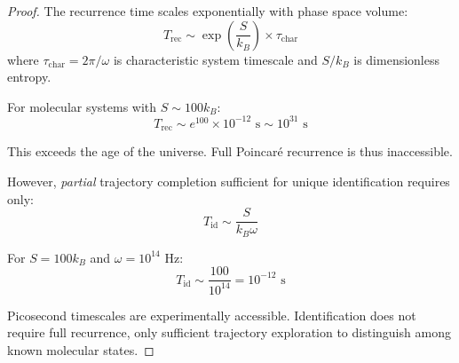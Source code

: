 \begin{proof}
The recurrence time scales exponentially with phase space volume:
\begin{equation}
T_{\text{rec}} \sim \exp\left(\frac{S}{k_B}\right) \times \tau_{\text{char}}
\end{equation}
where $\tau_{\text{char}} = 2\pi/\omega$ is characteristic system timescale and $S/k_B$ is dimensionless entropy.

For molecular systems with $S \sim 100 k_B$:
\begin{equation}
T_{\text{rec}} \sim e^{100} \times 10^{-12} \text{ s} \sim 10^{31} \text{ s}
\end{equation}

This exceeds the age of the universe. Full Poincaré recurrence is thus inaccessible.

However, \textit{partial} trajectory completion sufficient for unique identification requires only:
\begin{equation}
T_{\text{id}} \sim \frac{S}{k_B \omega}
\end{equation}

For $S = 100 k_B$ and $\omega = 10^{14}$ Hz:
\begin{equation}
T_{\text{id}} \sim \frac{100}{10^{14}} = 10^{-12} \text{ s}
\end{equation}

Picosecond timescales are experimentally accessible. Identification does not require full recurrence, only sufficient trajectory exploration to distinguish among known molecular states.
\end{proof}

